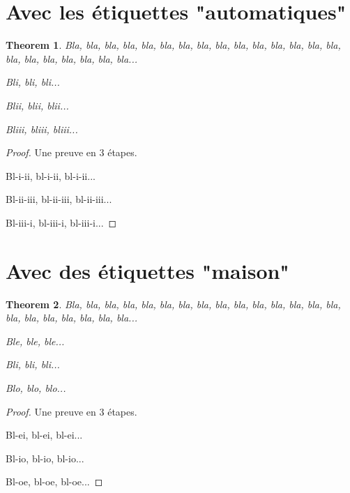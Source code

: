 \documentclass[varwidth, border = 3pt]{standalone}
\newtheorem{theorem}{Theorem}
\begin{document}
\section*{Avec les étiquettes "automatiques"}

\begin{theorem}
  Bla, bla, bla, bla, bla, bla, bla, bla, bla, bla, bla,
  bla, bla, bla, bla, bla, bla, bla, bla, bla, bla, bla...

  \begin{equivcond}
    \item Bli, bli, bli...

    \item Blii, blii, blii...

    \item Bliii, bliii, bliii...
  \end{equivcond}
\end{theorem}

\begin{proof}
  Une preuve en 3 étapes.

  Bl-i-ii, bl-i-ii, bl-i-ii...

  Bl-ii-iii, bl-ii-iii, bl-ii-iii...

  Bl-iii-i, bl-iii-i, bl-iii-i...
\end{proof}


\section*{Avec des étiquettes "maison"}

\begin{theorem}
  Bla, bla, bla, bla, bla, bla, bla, bla, bla, bla, bla,
  bla, bla, bla, bla, bla, bla, bla, bla, bla, bla, bla...

  \begin{equivcond}
    \item \label{e} Ble, ble, ble...

    \item \label{i} Bli, bli, bli...

    \item \label{o} Blo, blo, blo...
  \end{equivcond}
\end{theorem}

\begin{proof}
  Une preuve en 3 étapes.

  Bl-ei, bl-ei, bl-ei...

  Bl-io, bl-io, bl-io...

  Bl-oe, bl-oe, bl-oe...
\end{proof}
\end{document}
